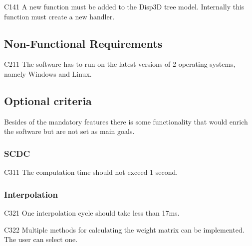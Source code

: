 	\begin{aims}
		
		\item[C141] A new function must be added to the Disp3D tree model. Internally this function must create a new 								handler.%
	\end{aims}
	
\subsection{Non-Functional Requirements}
	
	
	\begin{aims}

		\item[C211] The software has to run on the latest versions of 2 operating systems, namely Windows and Linux.%
	
	\end{aims}
	
\subsection{Optional criteria}
	
	Besides of the mandatory features there is some functionality that would enrich the software but are not set as main goals.  %
	
\subsubsection{SCDC}
	
	\begin{aims}
		
		\item[C311] The computation time should not exceed 1 second.
			
	\end{aims}
	
\subsubsection{Interpolation}

	\begin{aims}
	
		\item[C321] One interpolation cycle should take less than 17ms.
		\item[C322] Multiple methods for calculating the weight matrix can be implemented. The user can select one.
	
	\end{aims}
	
